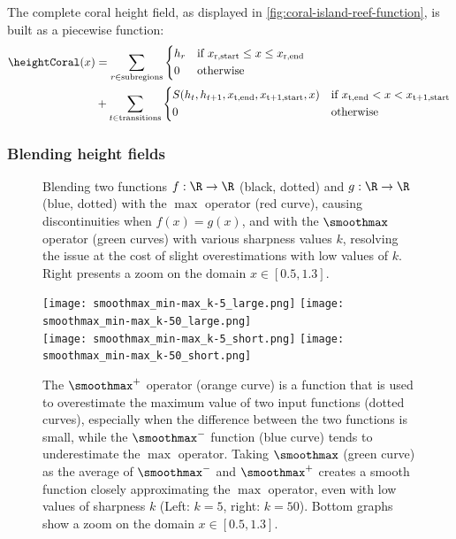 The complete coral height field, as displayed in \cref{fig:coral-island-reef-function}, is built as a piecewise function:
\begin{align}
    \label{eq:coral-island-full-reef-function}
    \heightCoral(x) &= \sum_{r \in \text{subregions}}{
    \begin{dcases}
        h_r & \text{if } x_{\text{r,start}} \leq x \leq x_{\text{r,end}} \\
        0 & \text{otherwise}
    \end{dcases}
    } \nonumber \\
    &+
    \sum_{t \in \text{transitions}} {
    \begin{dcases}
        S(h_{t}, h_{t+1}, x_{\text{t,end}}, x_{\text{t+1,start}}, x) & \text{if } x_{\text{t,end}} < x < x_{\text{t+1,start}} \\
        0 & \text{otherwise}
    \end{dcases}
    }
\end{align}

\subsubsection{Blending height fields}
\label{subsubsec:height-functions-blending}

\begin{figure}[H]
    \caption{Blending two functions $f: \R \to \R$ (black, dotted) and $g: \R \to \R$ (blue, dotted) with the $\max$ operator (red curve), causing discontinuities when $f(x)=g(x)$, and with the $\smoothmax$ operator (green curves) with various sharpness values $k$, resolving the issue at the cost of slight overestimations with low values of $k$. Right presents a zoom on the domain $x \in [0.5, 1.3]$. }
    \label{fig:coral-island-blend-function-island}
\end{figure}

\begin{figure}[H]
    \texttt{[image: smoothmax\_min-max\_k-5\_large.png]}
    \texttt{[image: smoothmax\_min-max\_k-50\_large.png]} \\
    \texttt{[image: smoothmax\_min-max\_k-5\_short.png]}
    \texttt{[image: smoothmax\_min-max\_k-50\_short.png]}
    \caption{The $\smoothmax^+$ operator (orange curve) is a function that is used to overestimate the maximum value of two input functions (dotted curves), especially when the difference between the two functions is small, while the $\smoothmax^-$ function (blue curve) tends to underestimate the $\max$ operator. Taking $\smoothmax$ (green curve) as the average of $\smoothmax^-$ and $\smoothmax^+$ creates a smooth function closely approximating the $\max$ operator, even with low values of sharpness $k$ (Left: $k=5$, right: $k=50$). Bottom graphs show a zoom on the domain $x \in [0.5, 1.3]$.}
    \label{fig:coral-island-blend-function-island-with-upper}
\end{figure}

